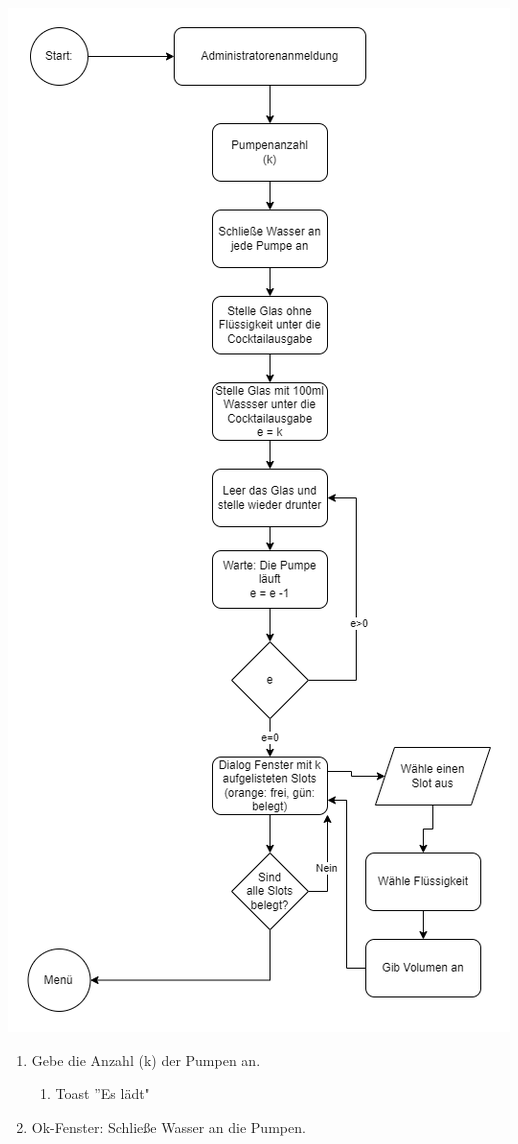 {\includegraphics[scale=0.65]{calibrate.png}

\begin{enumerate}
\item Gebe die Anzahl (k) der Pumpen an.
\begin{enumerate}
	\item Toast ''Es lädt"	
\end{enumerate}
	\item Ok-Fenster: Schließe Wasser an die Pumpen.
	

\end{enumerate}}
